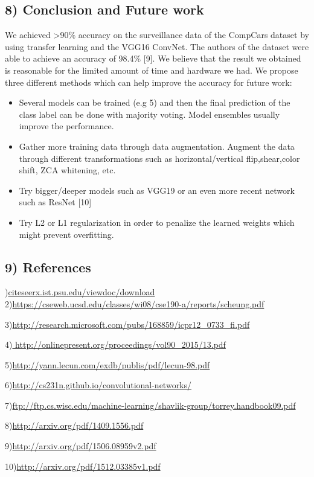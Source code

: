 \documentclass[a4paper]{article}
\begin{document}
\subsection*{8) Conclusion and Future work}
\begin{justify}
\flushleft
  We achieved >90\% accuracy on the surveillance data of the CompCars dataset by using transfer learning and the VGG16 ConvNet. The authors of the dataset were able to achieve an accuracy of 98.4\% [9]. We believe that the result we obtained is reasonable for the limited amount of time and hardware we had. We propose three different methods which can help improve the accuracy for future work:
  \begin{itemize}
  	\item Several models can be trained (e.g 5) and then the final prediction of the class label can be done with majority voting. Model ensembles usually improve the performance.
  	\item Gather more training data through data augmentation. Augment the data through different transformations such as horizontal/vertical flip,shear,color shift, ZCA whitening, etc.
  	\item Try bigger/deeper models such as VGG19 or an even more recent network such as ResNet [10]
  	\item Try L2 or L1 regularization in order to penalize the learned weights which might prevent overfitting.
  \end{itemize}
\end{justify}

\subsection*{9) References}
)\hyperref{http://citeseerx.ist.psu.edu/viewdoc/download?doi=10.1.1.488.284&rep=rep1&type=pdf}{}{}{citeseerx.ist.psu.edu/viewdoc/download}
2)\url{https://cseweb.ucsd.edu/classes/wi08/cse190-a/reports/scheung.pdf}

3)\url{http://research.microsoft.com/pubs/168859/icpr12_0733_fi.pdf}

4)\url{ http://onlinepresent.org/proceedings/vol90_2015/13.pdf}

5)\url{http://yann.lecun.com/exdb/publis/pdf/lecun-98.pdf}

6)\url{http://cs231n.github.io/convolutional-networks/}

7)\url{ftp://ftp.cs.wisc.edu/machine-learning/shavlik-group/torrey.handbook09.pdf}

8)\url{http://arxiv.org/pdf/1409.1556.pdf}

9)\url{http://arxiv.org/pdf/1506.08959v2.pdf}

10)\url{http://arxiv.org/pdf/1512.03385v1.pdf}
  
\newpage
\appendix
\end{document}
